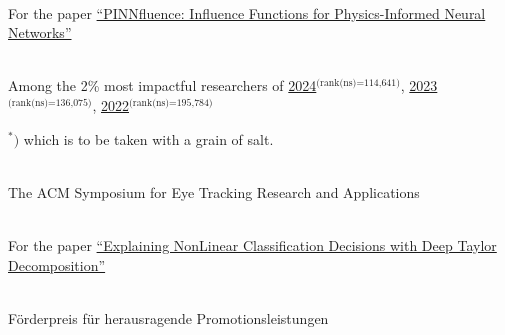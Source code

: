 
{
    \ifdefined\shortcv
        {}
    \else
        {
            \\
            For the paper
            \href{https://ml4physicalsciences.github.io/2024/files/NeurIPS_ML4PS_2024_254.pdf}{``PINNfluence: Influence Functions for Physics-Informed Neural Networks''}
        }
    \fi
}

{
    \ifdefined\shortcv
        {}
    \else
        {
            \\
            Among the 2\% most impactful researchers of
            \href{https://elsevier.digitalcommonsdata.com/datasets/btchxktzyw/7}{2024}$^\text{(rank(ns)=114,641)}$,
            \href{https://elsevier.digitalcommonsdata.com/datasets/btchxktzyw/6}{2023}$^\text{(rank(ns)=136,075)}$,
            \href{https://elsevier.digitalcommonsdata.com/datasets/btchxktzyw/4}{2022}$^\text{(rank(ns)=195,784)}$\phantom{,}

            
            
            \qquad $^\ast )$
            which is to be taken with a grain of salt.
        }
    \fi
}


{
    \ifdefined\shortcv
        {}
    \else
        {   \\
            The ACM Symposium for Eye Tracking Research and Applications
        }
    \fi
}



{
    \ifdefined\shortcv
        {}
    \else
        {
            \\
            For the paper
            \href{https://doi.org/10.1016/j.patcog.2016.11.008}{``Explaining NonLinear Classification Decisions with Deep Taylor Decomposition''}
        }
    \fi
}


{
    \ifdefined\shortcv
        {}
    \else
        {   \\
            F\"orderpreis f\"ur herausragende Promotionsleistungen
        }
    \fi
}


